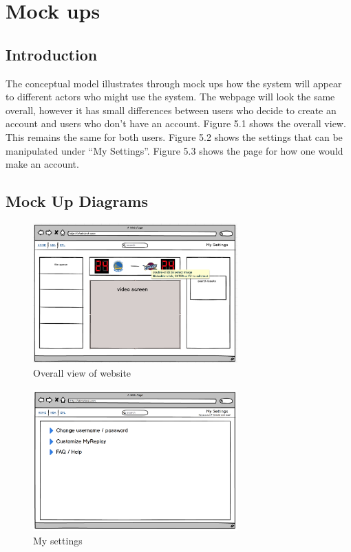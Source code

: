 \chapter{Mock ups}

\section{Introduction}
	The conceptual model illustrates through mock ups how the system will appear to different actors who might use the system. The webpage will look the same overall, however it has small differences between users who decide to create an account and users who don’t have an account.  Figure 5.1 shows the overall view. This remains the same for both users. Figure 5.2 shows the settings that can be manipulated under “My Settings”. Figure 5.3 shows the page for how one would make an account. 

\section{Mock Up Diagrams}
\begin{figure}[!ht]
      \centering
      \includegraphics[width=0.7\textwidth]{nbaView}
      \caption{Overall view of website}	
\end{figure}

\begin{figure}[!ht]
      \centering
      \includegraphics[width=0.7\textwidth]{MySettings}
      \caption{My settings}	
\end{figure}

